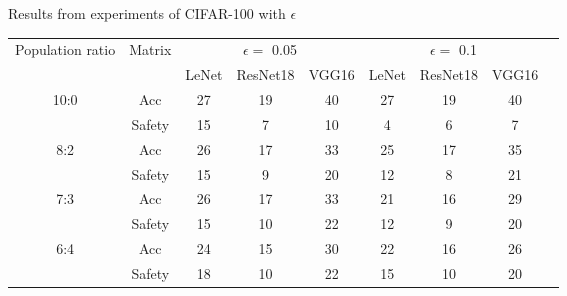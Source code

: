 \documentclass[symmetry,article,submit,moreauthors,pdftex]{Definitions/mdpi}
\begin{document}
\begin{specialtable}[H]
    \centering
    \caption{Results from experiments of CIFAR-100 with \begin{math}\epsilon\end{math}}
    \label{cifar100-results}
    {\small
    \begin{tabular}{|c|c|c|c|c|c|c|c|c|}
    \hline
    \multirow{2}{*}{Population ratio} & \multirow{2}{*}{Matrix} & \multicolumn{3}{c|}{\begin{math}\epsilon=\end{math} 0.05}  & \multicolumn{3}{c|}{\begin{math}\epsilon=\end{math} 0.1}       \\ \cline{3-8}
                                 &                           & LeNet               & ResNet18              & VGG16       & LeNet              & ResNet18              & VGG16              \\ \hline 
    \multirow{2}{*}{10:0}        & Acc                       & 27                  & 19                    & 40          & 27                 & 19                    & 40                 \\ \cline{2-8} 
                                 & Safety                    & 15                  & 7                     & 10          & 4                  & 6                     & 7                  \\ \hline 
    \multirow{2}{*}{8:2}         & Acc                       & 26                  & 17                    & 33          & 25                 & 17                    & 35                 \\ \cline{2-8} 
                                 & Safety                    & 15                  & 9                     & 20          & 12                 & 8                     & 21                 \\ \hline 
    \multirow{2}{*}{7:3}         & Acc                       & 26                  & 17                    & 33          & 21                 & 16                    & 29                 \\ \cline{2-8} 
                                 & Safety                    & 15                  & 10                    & 22          & 12                 & 9                     & 20                 \\ \hline 
    \multirow{2}{*}{6:4}         & Acc                       & 24                  & 15                    & 30          & 22                 & 16                    & 26                 \\ \cline{2-8} 
                                 & Safety                    & 18                  & 10                    & 22          & 15                 & 10                    & 20                 \\ \hline 
    \end{tabular}
    }
\end{specialtable}
\end{document}
